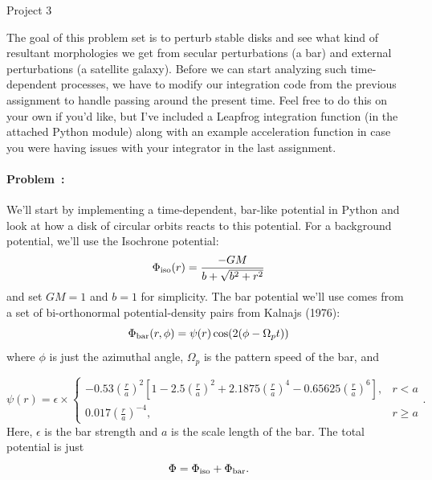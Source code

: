 \documentclass[12pt,twoside]{article}
\newcommand{\projectname}[1]{\begin{center} {\huge {#1}} \end{center}}
\newcommand{\problemname}{Problem}
\newcounter{problem}
\newenvironment{problem}{\paragraph{\problemname~\theproblem:}\refstepcounter{problem}}{}
\begin{document}
\projectname{Project 3}

The goal of this problem set is to perturb stable disks and see what kind of resultant morphologies we get from secular perturbations (a bar) and external perturbations (a satellite galaxy). Before we can start analyzing such time-dependent processes, we have to modify our integration code from the previous assignment to handle passing around the present time. Feel free to do this on your own if you'd like, but I've included a Leapfrog integration function (in the attached Python module) along with an example acceleration function in case you were having issues with your integrator in the last assignment. 

\begin{problem} 

We'll start by implementing a time-dependent, bar-like potential in Python and look at how a disk of circular orbits reacts to this potential. For a background potential, we'll use the Isochrone potential:
\begin{equation}
	\Phi_{\rm iso}(r) = \frac{-G M}{b + \sqrt{b^2+r^2}}
\end{equation}
and set $GM=1$ and $b=1$ for simplicity. The bar potential we'll use comes from a set of bi-orthonormal potential-density pairs from Kalnajs (1976):
\begin{equation}
	\Phi_{\rm bar}(r,\phi) = \psi(r) \cos(2(\phi - \Omega_p t))
\end{equation}
where $\phi$ is just the azimuthal angle, $\Omega_p$ is the pattern speed of the bar, and

\begin{equation}
	\psi(r) = \epsilon \times
	\begin{cases}
	    -0.53\left(\frac{r}{a}\right)^2 \left[ 1 - 2.5\left(\frac{r}{a}\right)^2 + 2.1875\left(\frac{r}{a}\right)^4 - 0.65625\left(\frac{r}{a}\right)^6 \right] ,& r < a\\
	    0.017\left(\frac{r}{a}\right)^{-4},   &  r \geq a
	\end{cases}.
\end{equation}
Here, $\epsilon$ is the bar strength and $a$ is the scale length of the bar. The total potential is just
\begin{equation}
	\Phi = \Phi_{\rm iso} + \Phi_{\rm bar}.
\end{equation}


\end{problem}
\end{document}
